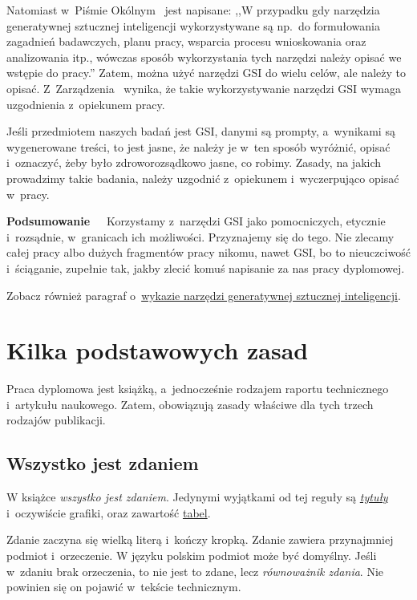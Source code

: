 Natomiast w~Piśmie Okólnym~\cite[\S~5]{zasady-generatywnej-SI-Okolnik} jest napisane: ,,W przypadku gdy narzędzia generatywnej sztucznej inteligencji wykorzystywane są np.\ do formułowania zagadnień badawczych, planu pracy, wsparcia procesu wnioskowania oraz analizowania itp., wówczas sposób wykorzystania tych narzędzi należy opisać we wstępie do pracy.'' Zatem, można użyć narzędzi GSI do wielu celów, ale należy to opisać. Z~Zarządzenia~ wynika, że takie wykorzystywanie narzędzi GSI wymaga uzgodnienia z~opiekunem pracy.

Jeśli przedmiotem naszych badań jest GSI, danymi są prompty, a~wynikami są wygenerowane treści, to jest jasne, że należy je w~ten sposób wyróżnić, opisać i~oznaczyć, żeby było zdroworozsądkowo jasne, co robimy. Zasady, na jakich prowadzimy takie badania, należy uzgodnić z~opiekunem i~wyczerpująco opisać w~pracy.

{\bf Podsumowanie~~} Korzystamy z~narzędzi GSI jako pomocniczych, etycznie i~rozsądnie, w~granicach ich możliwości. Przyznajemy się do tego. Nie zlecamy całej pracy albo dużych fragmentów pracy nikomu, nawet GSI, bo to nieuczciwość i~ściąganie, zupełnie tak, jakby zlecić komuś napisanie za nas pracy dyplomowej.

Zobacz również paragraf o~\hyperref[sec:dod:bibliografia-SI]{wykazie narzędzi generatywnej sztucznej inteligencji}.


\section{Kilka podstawowych zasad}
\label{sec:dod:zasady}

Praca dyplomowa jest książką, a~jednocześnie rodzajem raportu technicznego i~artykułu naukowego. Zatem, obowiązują zasady właściwe dla tych trzech rodzajów publikacji.


\subsection{Wszystko jest zdaniem}
\label{sec:dod:zdaniem}

W książce {\em wszystko jest zdaniem}. Jedynymi wyjątkami od tej reguły są \hyperref[sec:dod:tytul]{\em tytuły\/} i~oczywiście grafiki, oraz zawartość \hyperref[sec:dod:tabela]{tabel}.

Zdanie zaczyna się wielką literą i~kończy kropką. Zdanie zawiera przynajmniej podmiot i~orzeczenie. W języku polskim podmiot może być domyślny. Jeśli w~zdaniu brak orzeczenia, to nie jest to zdane, lecz {\em równoważnik zdania}. Nie powinien się on pojawić w~tekście technicznym.


